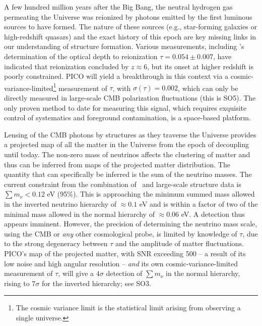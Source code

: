 \documentclass[PICOReport.tex]{subfiles}
\begin{document}
A few hundred million years after the Big Bang, the neutral hydrogen gas permeating the Universe was reionized by photons emitted by the first luminous sources to have formed.  The nature of these sources (e.g., star-forming galaxies or high-redshift quasars) and the exact history of this epoch are key missing links in our understanding of structure formation.  Various measurements, including \planck 's determination of the optical depth to reionization $\tau = 0.054 \pm 0.007$, have indicated that reionization concluded by $z \approx 6$, but its onset at higher redshift is poorly constrained. PICO will yield a breakthrough in this context via a cosmic-variance-limited\footnote{The cosmic variance limit is the statistical limit arising from observing a single universe.} measurement of $\tau$, with $\sigma(\tau)=0.002$, which can only be directly measured in large-scale CMB polarization fluctuations (this is SO5).  The only proven method to date for measuring this signal, which requires exquisite control of systematics and foreground contamination, is a space-based platform. 

Lensing of the CMB photons by structures as they traverse the Universe provides a projected map of all the matter in the Universe from the epoch of decoupling until today.  The non-zero mass of neutrinos affects the clustering of matter and thus can be inferred from maps of the projected matter distribution. The quantity that can specifically be inferred is the sum of the neutrino masses.  The current constraint from the combination of \planck\ and large-scale structure data is $\sum m_{\nu} < 0.12$ eV (95\%).  This is approaching the minimum summed mass allowed in the inverted neutrino hierarchy of $\approx 0.1$ eV and is within a factor of two of the minimal mass allowed in the normal hierarchy of $\approx 0.06$ eV.  A detection thus appears imminent.  However, the precision of determining the neutrino mass scale, using the CMB or {\it any} other cosmological probe, is limited by knowledge of $\tau$, due to the strong degeneracy between $\tau$ and the amplitude of matter fluctuations.  PICO's map of the projected matter, with \ac{SNR} exceeding 500 -- a result of its low noise and high angular resolution -- {\it and} its own cosmic-variance-limited measurement of $\tau$, will give a $4\sigma$ detection of $\sum m_{\nu}$ in the normal hierarchy, rising to $7\sigma$ for the inverted hierarchy; see SO3. 

\end{document}
